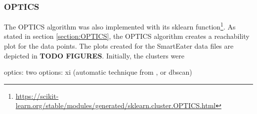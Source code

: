 



  


\subsubsection{OPTICS}
The OPTICS algorithm was also implemented with its sklearn function\footnote{\url{https://scikit-learn.org/stable/modules/generated/sklearn.cluster.OPTICS.html}}. As stated in section \ref{section:OPTICS}, the OPTICS algorithm creates a reachability plot for the data points. The plots created for the SmartEater data files are depicted in \textbf{TODO FIGURES}. Initially, the clusters were 





optics: two options: xi (automatic technique from \textcite{OPTICS}, or dbscan)





